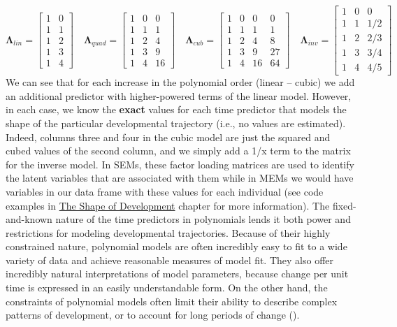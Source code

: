 \documentclass[11pt]{article}
\begin{document}
\scriptsize
\begin{equation} \label{eq:17}
\boldsymbol{\Lambda}_{lin} = \left[ \begin{array}{cc} 1 & 0 \\ 1 & 1 \\ 1 & 2 \\ 1 & 3 \\ 1 & 4 \end{array} \right] \quad
\boldsymbol{\Lambda}_{quad} = \left[ \begin{array}{ccc} 1 & 0 & 0 \\ 1 & 1 & 1 \\ 1 & 2 & 4 \\ 1 & 3 & 9 \\ 1 & 4 & 16 \end{array} \right] \quad
\boldsymbol{\Lambda}_{cub} = \left[ \begin{array}{cccc} 1 & 0 & 0 & 0 \\ 1 & 1 & 1 & 1 \\ 1 & 2 & 4 & 8 \\ 1 & 3 & 9 & 27 \\ 1 & 4 & 16 & 64 \end{array} \right] \quad
\boldsymbol{\Lambda}_{inv} = \left[ \begin{array}{ccc} 1 & 0 & 0 \\ 1 & 1 & 1/2 \\ 1 & 2 & 2/3 \\ 1 & 3 & 3/4 \\ 1 & 4 & 4/5 \end{array} \right]
\end{equation}
\normalsize
We can see that for each increase in the polynomial order (linear -- cubic) we add an additional predictor with higher-powered terms of the linear model. However, in each case, we know the \textbf{exact} values for each time predictor that models the shape of the particular developmental trajectory (i.e., no values are estimated). Indeed, columns three and four in the cubic model are just the squared and cubed values of the second column, and we simply add a 1/x term to the matrix for the inverse model. In SEMs, these factor loading matrices are used to identify the latent variables that are associated with them while in MEMs we would have variables in our data frame with these values for each individual (see code examples in \href{https://e-m-mccormick.github.io/static/longitudinal-primer/04-shape.html#polynomial-trajectories}{The Shape of Development} chapter for more information). The fixed-and-known nature of the time predictors in polynomials lends it both power and restrictions for modeling developmental trajectories. Because of their highly constrained nature, polynomial models are often incredibly easy to fit to a wide variety of data and achieve reasonable measures of model fit. They also offer incredibly natural interpretations of model parameters, because change per unit time is expressed in an easily understandable form. On the other hand, the constraints of polynomial models often limit their ability to describe complex patterns of development, or to account for long periods of change (\cite{fjell_when_2010,sorensen_recipe_2021,tamnes_development_2017}).
\end{document}
